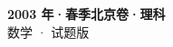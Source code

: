 \documentclass[zihao=-4, a4paper]{ctexart}
\begin{document}
\begin{center}
  {\Large\bfseries 2003 年·春季北京卷·理科}\\[4pt]
  {\large 数学 · 试题版}
\end{center}
\medskip
{}

\end{document}

